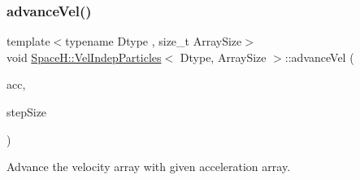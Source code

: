 \subsubsection{\texorpdfstring{advance\+Vel()}{advanceVel()}}
{\footnotesize\ttfamily template$<$typename Dtype , size\+\_\+t Array\+Size$>$ \\
void \mbox{\hyperlink{class_space_h_1_1_vel_indep_particles}{Space\+H\+::\+Vel\+Indep\+Particles}}$<$ Dtype, Array\+Size $>$\+::advance\+Vel (\begin{DoxyParamCaption}\item[{const \mbox{\hyperlink{class_space_h_1_1_vel_indep_particles_aa9983058940249df8b00fa800e8cbad2}{Vector\+Array}} \&}]{acc,  }\item[{\mbox{\hyperlink{class_space_h_1_1_vel_indep_particles_aeb47d8131b30ed790320ff634f0d6af1}{Scalar}}}]{step\+Size }\end{DoxyParamCaption})\hspace{0.3cm}{\ttfamily [inline]}}



Advance the velocity array with given acceleration array. 


